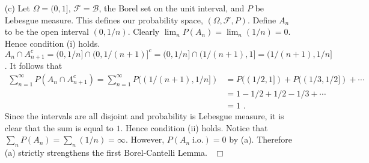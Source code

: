 \documentclass[letterpaper,10pt]{article}
\newcommand{\io}{\;\text{i.o.}}
\def \B {\mathscr{B}}
\def \F {\mathscr{F}}
\begin{document}
\begin{enumerate}
\item[(c)]
Let $\Omega = (0,1]$, $\F = \B$, the Borel set on the unit interval, and $P$ be Lebesgue measure. This defines our probability space, $(\Omega, \F, P)$. Define $A_n$ to be the open interval $(0,1/n)$. Clearly $\lim_n P(A_n) = \lim_n (1/n) = 0$. Hence condition (i) holds. $A_n \cap A_{n+1}^c = (0,1/n] \cap (0,1/(n+1)]^c = (0,1/n] \cap (1/(n+1),1] = (1/(n+1),1/n]$. It follows that
\begin{align*}
\sum_{n = 1}^\infty P(A_n\cap A_{n+1}^c) 
= \sum_{n=1}^\infty P((1/(n+1),1/n]) 
&= P((1/2, 1]) + P((1/3,1/2]) + \cdots \\
&= 1 - 1/2 + 1/2 - 1/3 + \cdots \\
&= 1
\text{ .}
\end{align*}
Since the intervals are all disjoint and probability is Lebesgue measure, it is clear that the sum is equal to $1$. Hence condition (ii) holds. Notice that $\sum_n P(A_n) = \sum_n (1/n) = \infty$. However, $P(A_n \io) = 0$ by (a). Therefore (a) strictly strengthens the first Borel-Cantelli Lemma.
\mbox{}~\hfill $\Box$

\end{enumerate}
\end{document}
